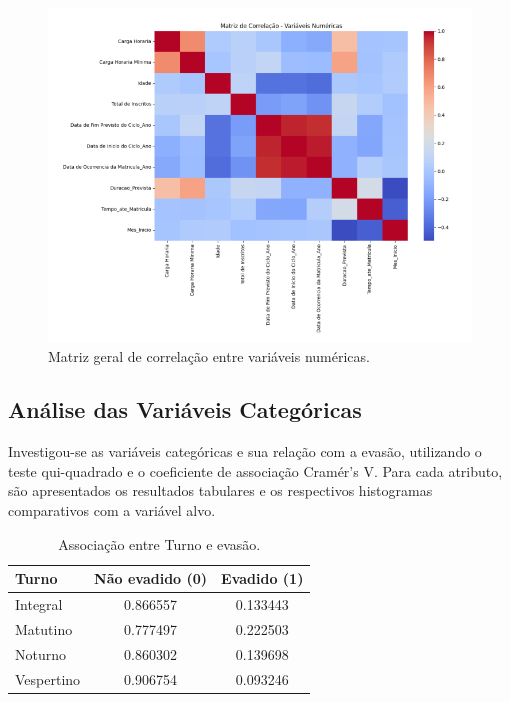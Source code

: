 \documentclass[english, spanish, brazilian]{RBIEarticle} %
\begin{document}
\begin{figure}[H]\centering
	\includegraphics[width=1\textwidth]{images/matriz-corr.png}
	\caption{Matriz geral de correlação entre variáveis numéricas.}
	\label{fig:corr-num-geral}
\end{figure}


\subsection{Análise das Variáveis Categóricas}

Investigou-se as variáveis categóricas e sua relação com a evasão, utilizando o teste qui-quadrado e o coeficiente de associação Cramér’s V. Para cada atributo, são apresentados os resultados tabulares e os respectivos histogramas comparativos com a variável alvo.

\begin{table}[H]
	\centering
	\caption{Associação entre Turno e evasão.}
	\label{tab:cat-turno}
	\begin{tabular}{lcc}
		\toprule
		\textbf{Turno} & \textbf{Não evadido (0)} & \textbf{Evadido (1)} \\
		\midrule
		Integral & 0.866557 & 0.133443 \\
		Matutino & 0.777497 & 0.222503 \\
		Noturno & 0.860302 & 0.139698 \\
		Vespertino & 0.906754 & 0.093246 \\
		\bottomrule
	\end{tabular}
\end{table}
\end{document}
